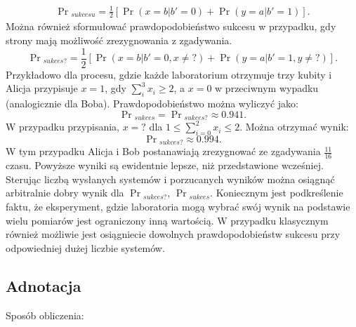 \documentclass[10pt]{article} %
\begin{document}
\begin{equation}
\begin{split}
\Pr{}_{sukcesu} = \frac{1}{2} \left[ \Pr(x=b|b'=0) + \Pr(y=a|b' = 1)\right].
\end{split}
\end{equation}
Można również sformułować prawdopodobieństwo sukcesu w przypadku, gdy strony mają możliwość zrezygnowania z zgadywania. %
\begin{equation}
\Pr{}_{sukces?} = \frac{1}{2} \left[ \Pr(x=b|b'=0, x\neq?) + \Pr(y=a|b' = 1, y\neq?)\right].
\end{equation} Przykładowo dla procesu, gdzie każde laboratorium otrzymuje trzy kubity i Alicja przypisuje $x=1$, gdy $\sum_i^3 x_i \geq 2$, a $x=0$ w przeciwnym wypadku (analogicznie dla Boba). Prawdopodobieństwo można wyliczyć jako:
\begin{equation}
\Pr{}_{sukces} = \Pr{}_{sukces?} \approx 0.941.
\end{equation} W przypadku przypisania, $x=?$ dla $1 \leq \sum_{i=0}^2 x_i \leq 2$. Można otrzymać wynik:
\begin{equation}
\Pr{}_{sukces?} \approx 0.994.
\end{equation}
W tym przypadku Alicja i Bob postanawiają zrezygnować ze zgadywania $\frac{11}{16}$ czasu. Powyższe wyniki są ewidentnie lepsze, niż przedstawione wcześniej. Sterując liczbą wysłanych systemów i porzucanych wyników można osiągnąć arbitralnie dobry wynik dla $\Pr{}_{sukces?}$, $\Pr{}_{sukces}$. Koniecznym jest podkreślenie faktu, że eksperyment, gdzie laboratoria mogą wybrać swój wynik na podstawie wielu pomiarów jest ograniczony inną wartością.
W przypadku klasycznym również możliwie jest osiągniecie dowolnych prawdopodobieństw sukcesu przy odpowiedniej dużej liczbie systemów. \subsection{Adnotacja}
Sposób obliczenia:
\end{document}
